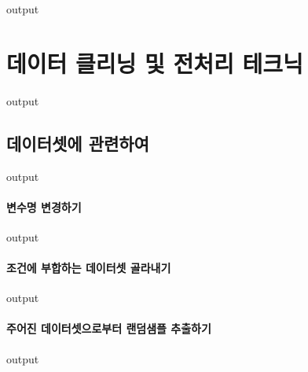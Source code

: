 \documentclass{report}
\begin{document}
\begin{Schunk}
\begin{Soutput}
output
\end{Soutput}
\end{Schunk}

\section{데이터 클리닝 및 전처리 테크닉}

\begin{Schunk}
\begin{Soutput}
output
\end{Soutput}
\end{Schunk}

\subsection{데이터셋에 관련하여}

\begin{Schunk}
\begin{Soutput}
output
\end{Soutput}
\end{Schunk}

\paragraph{변수명 변경하기}
\begin{Schunk}
\begin{Soutput}
output
\end{Soutput}
\end{Schunk}

\paragraph{조건에 부합하는 데이터셋 골라내기}
\begin{Schunk}
\begin{Soutput}
output
\end{Soutput}
\end{Schunk}

\paragraph{주어진 데이터셋으로부터 랜덤샘플 추출하기}
\begin{Schunk}
\begin{Soutput}
output
\end{Soutput}
\end{Schunk}
\end{document}
